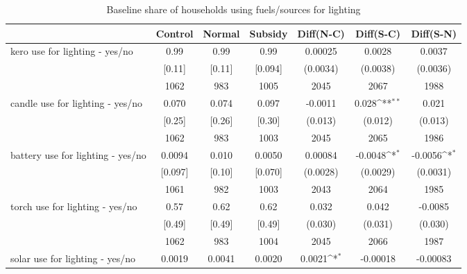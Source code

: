 \begin{table}[htbp]\centering
\def\sym#1{\ifmmode^{#1}\else\(^{#1}\)\fi}
\caption{Baseline share of households using fuels/sources for lighting \label{tab:"balance"}}
\begin{tabular*}{1\hsize}{@{\hskip\tabcolsep\extracolsep\fill}l*{1}{cccccc}}
\toprule
                                &  Control&   Normal&  Subsidy&Diff(N-C)         &Diff(S-C)         &Diff(S-N)         \\
\midrule
kero use for lighting  - yes/no &     0.99&     0.99&     0.99&  0.00025         &   0.0028         &   0.0037         \\
                                &   [0.11]&   [0.11]&  [0.094]& (0.0034)         & (0.0038)         & (0.0036)         \\
                                &     1062&      983&     1005&     2045         &     2067         &     1988         \\
candle use for lighting  - yes/no&    0.070&    0.074&    0.097&  -0.0011         &    0.028\sym{**} &    0.021         \\
                                &   [0.25]&   [0.26]&   [0.30]&  (0.013)         &  (0.012)         &  (0.013)         \\
                                &     1062&      983&     1003&     2045         &     2065         &     1986         \\
battery use for lighting  - yes/no&   0.0094&    0.010&   0.0050&  0.00084         &  -0.0048\sym{*}  &  -0.0056\sym{*}  \\
                                &  [0.097]&   [0.10]&  [0.070]& (0.0028)         & (0.0029)         & (0.0031)         \\
                                &     1061&      982&     1003&     2043         &     2064         &     1985         \\
torch use for lighting  - yes/no&     0.57&     0.62&     0.62&    0.032         &    0.042         &  -0.0085         \\
                                &   [0.49]&   [0.49]&   [0.49]&  (0.030)         &  (0.031)         &  (0.030)         \\
                                &     1062&      983&     1004&     2045         &     2066         &     1987         \\
solar use for lighting  - yes/no&   0.0019&   0.0041&   0.0020&   0.0021\sym{*}  & -0.00018         & -0.00083         \\

\end{tabular*}
\end{table}
